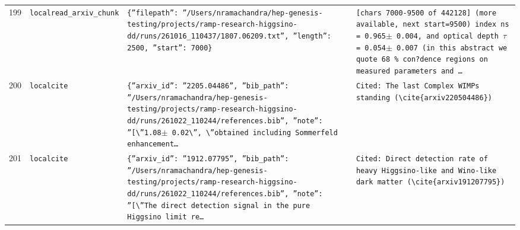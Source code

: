 \documentclass[11pt,a4paper]{article}
\begin{document}
\begin{longtable}{@{}p{}p{}p{}p{}@{}}
199 & \texttt{local}\newline\texttt{read\_\allowbreak{}arxiv\_\allowbreak{}chunk} & \texttt{\{''filepath'':\allowbreak{} ''/\allowbreak{}Users/\allowbreak{}nramachandra/\allowbreak{}hep-genesis-testing/\allowbreak{}projects/\allowbreak{}ramp-research-higgsino-dd/\allowbreak{}runs/\allowbreak{}261016\_\allowbreak{}110437/\allowbreak{}1807.06209.txt'',\allowbreak{} ''length'':\allowbreak{} 2500,\allowbreak{} ''start'':\allowbreak{} 7000\}\allowbreak{}} & \texttt{[chars 7000-9500 of 442128]\allowbreak{} (more available,\allowbreak{} next start=\allowbreak{}9500)\allowbreak{}  index ns =\allowbreak{} 0.965$\pm$ 0.004,\allowbreak{} and optical depth $\tau$ =\allowbreak{} 0.054$\pm$ 0.007 (in this abstract we quote 68 \% con?dence regions on measured parameters and \ldots{}\allowbreak{}} \\
200 & \texttt{local}\newline\texttt{cite} & \texttt{\{''arxiv\_\allowbreak{}id'':\allowbreak{} ''2205.04486'',\allowbreak{} ''bib\_\allowbreak{}path'':\allowbreak{} ''/\allowbreak{}Users/\allowbreak{}nramachandra/\allowbreak{}hep-genesis-testing/\allowbreak{}projects/\allowbreak{}ramp-research-higgsino-dd/\allowbreak{}runs/\allowbreak{}261022\_\allowbreak{}110244/\allowbreak{}references.bib'',\allowbreak{} ''note'':\allowbreak{} ''[\textbackslash{}\allowbreak{}''1.08$\pm$ 0.02\textbackslash{}\allowbreak{}'',\allowbreak{} \textbackslash{}\allowbreak{}''obtained including Sommerfeld enhancement\ldots{}\allowbreak{}} & \texttt{Cited:\allowbreak{} The last Complex WIMPs standing (\textbackslash{}\allowbreak{}cite\{arxiv220504486\}\allowbreak{})\allowbreak{}} \\
201 & \texttt{local}\newline\texttt{cite} & \texttt{\{''arxiv\_\allowbreak{}id'':\allowbreak{} ''1912.07795'',\allowbreak{} ''bib\_\allowbreak{}path'':\allowbreak{} ''/\allowbreak{}Users/\allowbreak{}nramachandra/\allowbreak{}hep-genesis-testing/\allowbreak{}projects/\allowbreak{}ramp-research-higgsino-dd/\allowbreak{}runs/\allowbreak{}261022\_\allowbreak{}110244/\allowbreak{}references.bib'',\allowbreak{} ''note'':\allowbreak{} ''[\textbackslash{}\allowbreak{}''The direct detection signal in the pure Higgsino limit re\ldots{}\allowbreak{}} & \texttt{Cited:\allowbreak{} Direct detection rate of heavy Higgsino-like and Wino-like dark matter (\textbackslash{}\allowbreak{}cite\{arxiv191207795\}\allowbreak{})\allowbreak{}} \\

\end{longtable}
\end{document}
